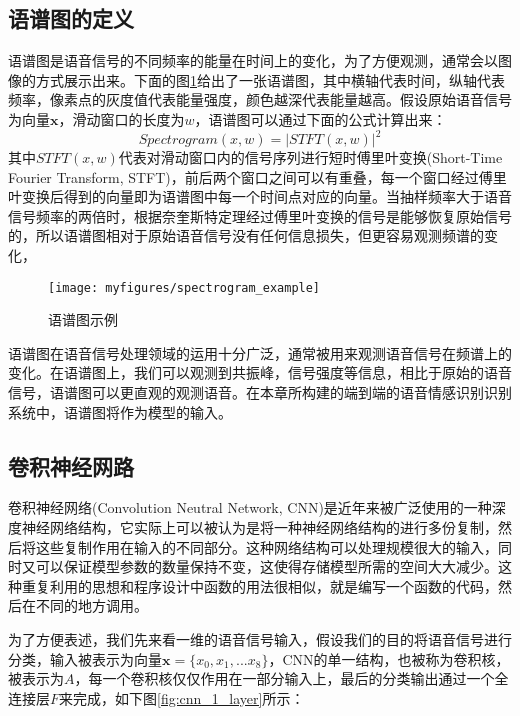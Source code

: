 \subsection{语谱图的定义}
\label{ssec:spectrogram}

语谱图是语音信号的不同频率的能量在时间上的变化，为了方便观测，通常会以图像的方式展示出来。下面的图\ref{fig:spectrogram_example}给出了一张语谱图，其中横轴代表时间，纵轴代表频率，像素点的灰度值代表能量强度，颜色越深代表能量越高。假设原始语音信号为向量$\mathbf{x}$，滑动窗口的长度为$w$，语谱图可以通过下面的公式计算出来：
\begin{equation}
\label{equ:spectrogram}
    Spectrogram(x, w) = |STFT(x, w)|^2
\end{equation}
其中$STFT(x, w)$代表对滑动窗口内的信号序列进行短时傅里叶变换(Short-Time Fourier Transform, STFT)，前后两个窗口之间可以有重叠，每一个窗口经过傅里叶变换后得到的向量即为语谱图中每一个时间点对应的向量。当抽样频率大于语音信号频率的两倍时，根据奈奎斯特定理经过傅里叶变换的信号是能够恢复原始信号的，所以语谱图相对于原始语音信号没有任何信息损失，但更容易观测频谱的变化，

\begin{figure}[htb] %
    \centering
    \texttt{[image: myfigures/spectrogram\_example]}
    \caption{语谱图示例}
    \label{fig:spectrogram_example}
\end{figure}

语谱图在语音信号处理领域的运用十分广泛，通常被用来观测语音信号在频谱上的变化。在语谱图上，我们可以观测到共振峰，信号强度等信息，相比于原始的语音信号，语谱图可以更直观的观测语音。在本章所构建的端到端的语音情感识别识别系统中，语谱图将作为模型的输入。

\subsection{卷积神经网路}
\label{ssec:cnn}

卷积神经网络(Convolution Neutral Network, CNN)是近年来被广泛使用的一种深度神经网络结构，它实际上可以被认为是将一种神经网络结构的进行多份复制，然后将这些复制作用在输入的不同部分。这种网络结构可以处理规模很大的输入，同时又可以保证模型参数的数量保持不变，这使得存储模型所需的空间大大减少。这种重复利用的思想和程序设计中函数的用法很相似，就是编写一个函数的代码，然后在不同的地方调用。

为了方便表述，我们先来看一维的语音信号输入，假设我们的目的将语音信号进行分类，输入被表示为向量$\mathbf{x}=\{x_0,x_1,...x_8\}$，CNN的单一结构，也被称为卷积核，被表示为$A$，每一个卷积核仅仅作用在一部分输入上，最后的分类输出通过一个全连接层$F$来完成，如下图\ref{fig:cnn_1_layer}所示：

